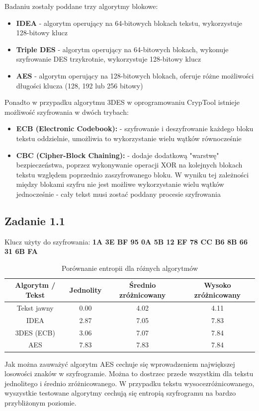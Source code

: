 \documentclass{article}
\begin{document}
Badaniu zostały poddane trzy algorytmy blokowe:
\begin{itemize}
    \item \textbf{IDEA} - algorytm operujący na 64-bitowych blokach tekstu, wykorzystuje 128-bitowy klucz
    \item \textbf{Triple DES} - algorytm operujący na 64-bitowych blokach, wykonuje szyfrowanie DES trzykrotnie, wykorzystuje 128-bitowy klucz
    \item \textbf{AES} - algorytm operujący na 128-bitowych blokach, oferuje różne możliwości długości klucza (128, 192 lub 256 bitowy)
\end{itemize}
Ponadto w przypadku algorytmu 3DES w oprogramowaniu CrypTool istnieje możliwość szyfrowania w dwóch trybach:
\begin{itemize}
    \item \textbf{ECB (Electronic Codebook):} - szyfrowanie i deszyfrowanie każdego bloku tekstu oddzielnie, umożliwia to wykorzystanie wielu wątków równocześnie 
    \item \textbf{CBC (Cipher-Block Chaining):} - dodaje dodatkową "warstwę" bezpieczeństwa, poprzez wykonywanie operacji XOR na kolejnych blokach tekstu względem poprzednio zaszyfrowanego bloku. W wyniku tej zależności między blokami szyfru nie jest możliwe wykorzystanie wielu wątków jednocześnie - cały tekst musi zostać poddany procesie szyfrowania
\end{itemize}
\subsection{Zadanie 1.1}
    Klucz użyty do szyfrowania: \textbf{1A 3E BF 95 0A 5B 12 EF 78 CC B6 8B 66 31 6B FA}
    \begin{table}[H]
        \centering
        \caption{Porównanie entropii dla różnych algorytmów}
        \begin{tabular}{|c|c|c|c|}
        \hline
        Algorytm / Tekst & Jednolity & Średnio zróżnicowany & Wysoko zróżnicowany  \\ \hline
        Tekst jawny & 0.00 & 4.02 & 4.11 \\  \hline
        IDEA & 2.87 & 7.05 & 7.83  \\  \hline
        3DES (ECB) & 3.06  & 7.07 & 7.84 \\ \hline
        AES & 7.83 & 7.83 & 7.84 \\  \hline
        \end{tabular}
    \end{table}
    Jak można zauważyć algorytm AES cechuje się wprowadzeniem największej losowości znaków w szyfrogramie. Można to dostrzec
    przede wszystkim dla tekstu jednolitego i średnio zróżnicowanego. W przypadku tekstu wysocezróżnicowanego, wyszystkie testowane algorytmy
    cechują się entropią szyfrogramu na bardzo przybliżonym poziomie.
\end{document}
